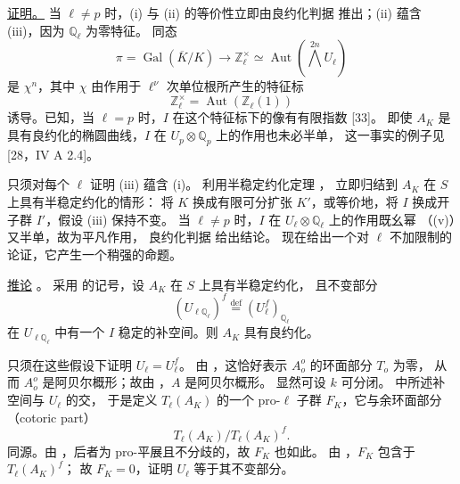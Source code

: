 \noindent
\underline{证明。} 当 $\ell\neq p$ 时，(i) 与 (ii) 的等价性立即由良约化判据
 推出；(ii) 蕴含 (iii)，因为 $\mathbb Q_\ell$ 为零特征。
同态
\[
 \pi=\operatorname{Gal}(\overline K/K)
 \longrightarrow \mathbb Z_\ell^\times
 \simeq\operatorname{Aut}\!\left(\bigwedge^{2n}U_\ell\right)
\]
是 $\chi^n$，其中 $\chi$ 由作用于 $\ell^\nu$ 次单位根所产生的特征标
\[
 \mathbb Z_\ell^\times=\operatorname{Aut}(\mathbb Z_\ell(1))
\]
诱导。已知，当 $\ell=p$ 时，$I$ 在这个特征标下的像有有限指数 [33]。
即使 $A_K$ 是具有良约化的椭圆曲线，$I$ 在 $U_p\otimes\mathbb Q_p$ 上的作用也未必半单，
这一事实的例子见 [28，IV A 2.4]。

只须对每个 $\ell$ 证明 (iii) 蕴含 (i)。
利用半稳定约化定理 ，
立即归结到 $A_K$ 在 $S$ 上具有半稳定约化的情形：
将 $K$ 换成有限可分扩张 $K'$，或等价地，将 $I$ 换成开子群 $I'$，假设 (iii) 保持不变。
当 $\ell\neq p$ 时，$I$ 在 $U_\ell\otimes\mathbb Q_\ell$ 上的作用既幺幂
（(v)）又半单，故为平凡作用，
良约化判据  给出结论。
现在给出一个对 $\ell$ 不加限制的论证，它产生一个稍强的命题。

\medskip
\noindent
\underline{推论} 。
采用  的记号，设 $A_K$ 在 $S$ 上具有半稳定约化，
且不变部分
\[
 (U_{\ell\mathbb Q_\ell})^f
 \stackrel{\mathrm{def}}{=}(U_\ell^f)_{\mathbb Q_\ell}
\]
在 $U_{\ell\mathbb Q_\ell}$ 中有一个 $I$ 稳定的补空间。则 $A_K$ 具有良约化。

只须在这些假设下证明 $U_\ell=U_\ell^f$。
由 ，这恰好表示 $A_o^o$ 的环面部分 $T_o$ 为零，
从而 $A_o^o$ 是阿贝尔概形；故由 ，$A$ 是阿贝尔概形。
显然可设 $k$ 可分闭。 中所述补空间与 $U_\ell$ 的交，
于是定义 $T_\ell(A_K)$ 的一个 pro-$\ell$ 子群 $F_K$，它与余环面部分（cotoric part）
\[
 T_\ell(A_K)/T_\ell(A_K)^f.
\]
同源。由 ，后者为 pro-平展且不分歧的，故 $F_K$ 也如此。
由 ，$F_K$ 包含于 $T_\ell(A_K)^f$；
故 $F_K=0$，证明 $U_\ell$ 等于其不变部分。


